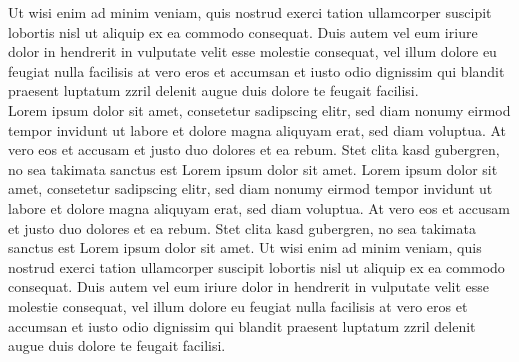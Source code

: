 \documentclass[10pt]{scrartcl}
\begin{document}
Ut wisi enim ad minim veniam, quis nostrud exerci tation ullamcorper suscipit lobortis nisl ut aliquip ex ea commodo consequat. Duis autem vel eum iriure dolor in hendrerit in vulputate velit esse molestie consequat, vel illum dolore eu feugiat nulla facilisis at vero eros et accumsan et iusto odio dignissim qui blandit praesent luptatum zzril delenit augue duis dolore te feugait facilisi.\\[8pt]
Lorem ipsum dolor sit amet, consetetur sadipscing elitr, sed diam nonumy eirmod tempor invidunt ut labore et dolore magna aliquyam erat, sed diam voluptua. At vero eos et accusam et justo duo dolores et ea rebum. Stet clita kasd gubergren, no sea takimata sanctus est Lorem ipsum dolor sit amet. Lorem ipsum dolor sit amet, consetetur sadipscing elitr, sed diam nonumy eirmod tempor invidunt ut labore et dolore magna aliquyam erat, sed diam voluptua. At vero eos et accusam et justo duo dolores et ea rebum. Stet clita kasd gubergren, no sea takimata sanctus est Lorem ipsum dolor sit amet. Ut wisi enim ad minim veniam, quis nostrud exerci tation ullamcorper suscipit lobortis nisl ut aliquip ex ea commodo consequat. Duis autem vel eum iriure dolor in hendrerit in vulputate velit esse molestie consequat, vel illum dolore eu feugiat nulla facilisis at vero eros et accumsan et iusto odio dignissim qui blandit praesent luptatum zzril delenit augue duis dolore te feugait facilisi.
\end{document}
